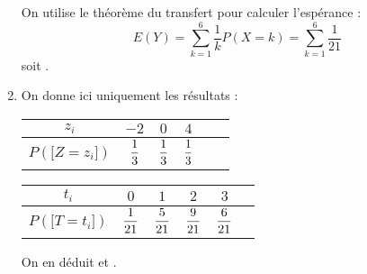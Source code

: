 \documentclass[a4paper, 11pt,reqno]{article}
\begin{document}
\begin{correction}
\begin{enumerate}
		      On utilise le th\'eor\`eme du transfert pour calculer l'esp\'erance :
		      $$E(Y) = \sum_{k=1}^6 \frac{1}{k} P(X=k) = \sum_{k=1}^6 \frac{1}{21}$$
		      soit .
		\item On donne ici uniquement les r\'esultats :
		      \begin{center} \begin{tabular}{|c|c|c|c|c|c|} \hline $z_i$     & $-2$               & $0$                & $4$                \\
               \hline $P(\lbrack Z=z_i\rbrack)$ & $\displaystyle \frac{1}{3}$ & $\displaystyle \frac{1}{3}$ & $\displaystyle \frac{1}{3}$
               \\ \hline
			      \end{tabular} %
			      \quad \begin{tabular}{|c|c|c|c|c|c|} \hline $t_i$     & $0$                 & $1$                 & $2$                 & $3$                 \\
               \hline $P(\lbrack T=t_i\rbrack)$ & $\displaystyle \frac{1}{21}$ & $\displaystyle \frac{5}{21}$ & $\displaystyle \frac{9}{21}$ & $\displaystyle \frac{6}{21}$
               \\ \hline
			      \end{tabular}
		      \end{center}
		      On en d\'eduit  et .
	\end{enumerate}
\end{correction}
\end{document}
